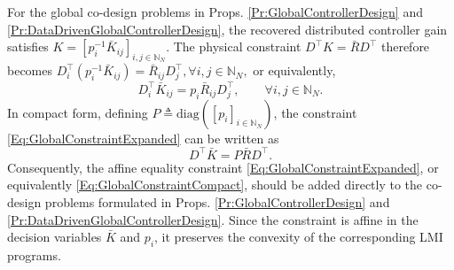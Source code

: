 \documentclass[letterpaper, 10 pt, conference]{ieeeconf}%
\newcommand{\N}{\mathbb{N}}
\newcommand{\T}{\top}
\newcommand{\0}{\mathbf{0}}
\newcommand{\diag}{\text{diag}}
\begin{document}
For the global co-design problems in Props. \ref{Pr:GlobalControllerDesign} and \ref{Pr:DataDrivenGlobalControllerDesign}, the recovered distributed controller gain satisfies $K=[p_i^{-1}\bar K_{ij}]_{i,j\in\N_N}$. The physical constraint $D^\T K=\bar R D^\T$ therefore becomes $D_i^\T(p_i^{-1}\bar K_{ij}) = \bar R_{ij}D_j^\T, \forall i,j\in\N_N,$ or equivalently, \begin{equation}\label{Eq:GlobalConstraintExpanded} 
D_i^\T\bar K_{ij} = p_i\bar R_{ij}D_j^\T, \qquad \forall i,j\in\N_N. 
\end{equation} 
In compact form, defining $P\triangleq\diag([p_i]_{i\in\N_N})$, the constraint \eqref{Eq:GlobalConstraintExpanded} can be written as 
\begin{equation}\label{Eq:GlobalConstraintCompact} 
D^\T\bar K=P\bar R D^\T. 
\end{equation} 
Consequently, the affine equality constraint \eqref{Eq:GlobalConstraintExpanded}, or equivalently \eqref{Eq:GlobalConstraintCompact}, should be added directly to the co-design problems formulated in Props. \ref{Pr:GlobalControllerDesign} and \ref{Pr:DataDrivenGlobalControllerDesign}. Since the constraint is affine in the decision variables $\bar K$ and $p_i$, it preserves the convexity of the corresponding LMI programs.


 
\end{document}
